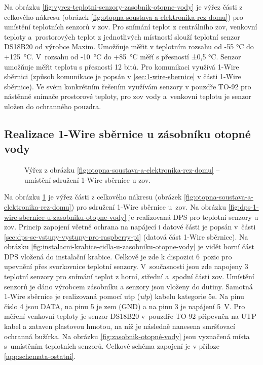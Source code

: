 Na obrázku \ref{fig:vyrez-teplotni-senzory-zasobnik-otopne-vody} je výřez části z celkového nákresu (obrázek \ref{fig:otopna-soustava-a-elektronika-rez-domu}) pro umístění teplotních senzorů v \acrshort{zov}. Pro snímání teplot z centrálního \acrshort{zov}, venkovní teploty a~prostorových teplot z jednotlivých místností slouží teplotní senzor DS18B20 \cite{vyrobce-ds18b20} od výrobce Maxim. Umožňuje měřit v teplotním rozsahu od -55 °C do +125~°C. V~rozsahu od -10~°C do +85~°C měří s přesností ±0,5 °C. Senzor umožňuje měřit teplotu s přesností 12 bitů. Pro komunikaci využívá 1-Wire sběrnici (způsob komunikace je popsán v \ref{sec:1-wire-sbernice} v části 1-Wire sběrnice). Ve svém konkrétním řešením využívám senzory v pouzdře TO-92 pro nástěnné snímače prostorové teploty, pro \acrshort{zov} vody a~venkovní teplotu je senzor uložen do ochranného pouzdra.

\subsection{Realizace 1-Wire sběrnice u zásobníku otopné vody}
\begin{figure}[H]
   \centering
   \def\svgwidth{0.2\columnwidth}
   
   \caption[Výřez pro umístění sdružení 1-Wire sběrnice u \acrshort{zov}.]{Výřez z obrázku \ref{fig:otopna-soustava-a-elektronika-rez-domu} – umístění sdružení 1-Wire sběrnice u \acrshort{zov}.}
    \label{fig:vyrez-1-wire-sbernice-u-zasobniku-otopne-vody}
\end{figure}

Na obrázku \ref{fig:vyrez-1-wire-sbernice-u-zasobniku-otopne-vody} je výřez části z celkového nákresu (obrázek \ref{fig:otopna-soustava-a-elektronika-rez-domu}) pro sdružení 1-Wire sběrnice u~\acrshort{zov}. Na obrázku \ref{fig:dps-1-wire-sbernice-u-zasobniku-otopne-vody} je realizovaná DPS pro teplotní senzory u \acrshort{zov}. Princip zapojení včetně ochrana na napájecí i datové části je popsán v~části \ref{sec:dps-se-vstupy-vystupy-pro-raspberry-pi} (datová část 1-Wire sběrnice). Na obrázku \ref{fig:instalacni-krabice-cidla-u-zasobniku-otopne-vody} je vidět horní část DPS vložená do instalační krabice. Celkově je zde k dispozici 6~pozic pro upevnění přes svorkovnice teplotní senzory. V~současnosti jsou zde napojeny 3 teplotní senzory pro snímání teplot z horní, střední a~spodní části \acrshort{zov}. Umístění senzorů je dáno výrobcem zásobníku a senzory jsou vloženy do dutiny. Samotná 1-Wire sběrnice je realizovaná pomocí \acrshort{utp} (\textit{\acrlong{utp}}) kabelu kategorie 5e. Na pinu číslo 4 jsou DATA, na pinu 5 je zem (GND) a na pinu 3 je napájení 5~V. Pro měření venkovní teploty je senzor DS18B20 v~pouzdře TO-92 připevněn na UTP kabel a zataven plastovou hmotou, na níž je následně nanesena smršťovací ochranná bužírka. Na obrázku \ref{fig:zasobnik-otopné-vody} jsou vyznačená místa s~umístěním teplotních senzorů. Celkové schéma zapojení je v příloze \ref{app:schemata-ostatni}.

